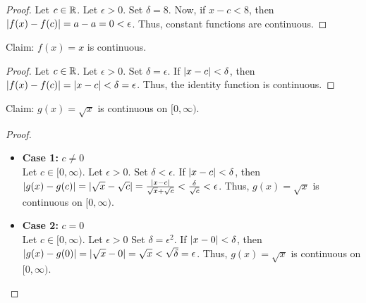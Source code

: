 \begin{customframedproof}[linecolor=xgray]
    \begin{proof}
        Let \(c \in \mathbb{R}\). Let \(\epsilon > 0\). Set \(\delta = 8\). Now, if \(x - c < 8\), then \(\left|f(x) - f(c)\right| = a - a = 0 < \epsilon\). Thus, constant functions are continuous.
    \end{proof}
\end{customframedproof}

Claim: \(f(x) = x\) is continuous.

\begin{customframedproof}[linecolor=xgray]
    \begin{proof}
        Let \(c \in \mathbb{R}\). Let \(\epsilon > 0\). Set \(\delta = \epsilon\). If \(\left|x - c\right| < \delta\), then \(\left|f(x) - f(c)\right| = \left|x - c\right| < \delta = \epsilon\). Thus, the identity function is continuous.
    \end{proof}
\end{customframedproof}



Claim: \(g(x) = \sqrt{x}\) is continuous on \([0,\infty)\).

\begin{customframedproof}[linecolor=xgray]
    \begin{proof}
        \begin{itemize}
            \item \textbf{Case 1:} \(c \ne 0\) \\

                  Let \(c \in [0,\infty)\). Let \(\epsilon > 0\). Set \(\delta < \epsilon\). If \(\left|x - c\right| < \delta\), then \(\left|g(x) - g(c)\right| = \left|\sqrt{x} - \sqrt{c}\right| = \frac{\left|x - c\right|}{\sqrt{x} + \sqrt{c}} < \frac{\delta}{\sqrt{c}} < \epsilon\). Thus, \(g(x) = \sqrt{x}\) is continuous on \([0,\infty)\).

            \item \textbf{Case 2:} \(c = 0\) \\

                  Let \(c \in [0,\infty)\). Let \(\epsilon > 0\) Set \(\delta = \epsilon^2\). If \(\left|x - 0\right| < \delta\), then \(\left|g(x) - g(0)\right| = \left|\sqrt{x} - 0\right| = \sqrt{x} < \sqrt{\delta} = \epsilon\). Thus, \(g(x) = \sqrt{x}\) is continuous on \([0,\infty)\).
        \end{itemize}

    \end{proof}
\end{customframedproof}

